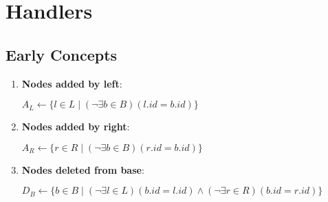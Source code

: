 \documentclass[a4paper]{article}
\begin{document}
    

    \section{Handlers}

    \subsection{Early Concepts}

    \begin{enumerate}
        \item \textbf{Nodes added by left}:
        
        $A_L \leftarrow \{l \in L \mid (\lnot \exists b \in B)(l.id = b.id)\}$\;

        \item \textbf{Nodes added by right}:
        
        $A_R \leftarrow \{r \in R \mid (\lnot \exists b \in B)(r.id = b.id)\}$\;

        \item \textbf{Nodes deleted from base}:
        
        $D_B \leftarrow \{b \in B \mid (\lnot \exists l \in L)(b.id = l.id) \land (\lnot \exists r \in R)(b.id = r.id)\}$\;
    \end{enumerate}

    
    
    
    
\end{document}
